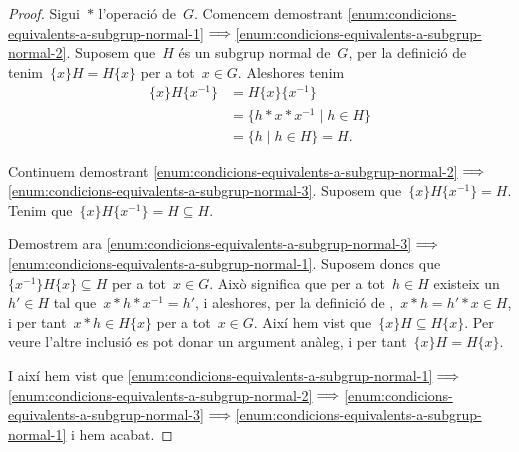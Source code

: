 \documentclass[../estructures-algebraiques.tex]{subfiles}
\begin{document}
    \begin{proof}
        Sigui~\(\ast\) l'operació de~\(G\).
        Comencem demostrant \eqref{enum:condicions-equivalents-a-subgrup-normal-1}\(\implies\)\eqref{enum:condicions-equivalents-a-subgrup-normal-2}.
        Suposem que~\(H\) és un subgrup normal de~\(G\), per la definició de  tenim~\(\{x\}H=H\{x\}\) per a tot~\(x\in G\).
        Aleshores tenim
        \begin{align*}
        \{x\}H\{x^{-1}\}&=H\{x\}\{x^{-1}\}\\
        &=\{h\ast x\ast x^{-1}\mid h\in H\}\\
        &=\{h\mid h\in H\}=H.
        \end{align*}

        Continuem demostrant \eqref{enum:condicions-equivalents-a-subgrup-normal-2}\(\implies\)\eqref{enum:condicions-equivalents-a-subgrup-normal-3}.
        Suposem que~\(\{x\}H\{x^{-1}\}=H\).
        Tenim que~\(\{x\}H\{x^{-1}\}=H\subseteq H\).

        Demostrem ara \eqref{enum:condicions-equivalents-a-subgrup-normal-3}\(\implies\)\eqref{enum:condicions-equivalents-a-subgrup-normal-1}.
        Suposem doncs que~\(\{x^{-1}\}H\{x\}\subseteq H\) per a tot~\(x\in G\).
        Això significa que per a tot~\(h\in H\) existeix un~\(h'\in H\) tal que~\(x\ast h\ast x^{-1}=h'\), i aleshores, per la definició de ,~\(x\ast h=h'\ast x\in H\), i per tant~\(x\ast h\in H\{x\}\) per a tot~\(x\in G\).
        Així hem vist que~\(\{x\}H\subseteq H\{x\}\).
        Per veure l'altre inclusió es pot donar un argument anàleg, i per tant~\(\{x\}H= H\{x\}\).

        I així hem vist que \eqref{enum:condicions-equivalents-a-subgrup-normal-1}\(\implies\)\eqref{enum:condicions-equivalents-a-subgrup-normal-2}\(\implies\)\eqref{enum:condicions-equivalents-a-subgrup-normal-3}\(\implies\)\eqref{enum:condicions-equivalents-a-subgrup-normal-1} i hem acabat.
    \end{proof}
\end{document}
